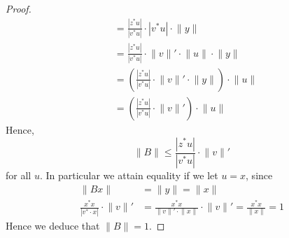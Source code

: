 \documentclass[12pt]{article}
\newenvironment{sol}[1][Solution]{\begin{trivlist}
		\item[\hskip \labelsep {\bfseries #1:}]}{\end{trivlist}}
\begin{document}
\begin{sol}
\begin{enumerate}[label=(\alph*)]
\begin{proof}
\begin{align*}
				&=\frac{|z^*u|}{|v^*u|}\cdot |v^*u| \cdot \lVert y\rVert\\
				&=\frac{|z^*u|}{|v^*u|}\cdot \lVert v\rVert'\cdot\lVert u\rVert\cdot  \lVert y\rVert\\
				&=\left(\frac{|z^*u|}{|v^*u|}\cdot \lVert v\rVert'\cdot  \lVert y\rVert\right)\cdot \lVert u\rVert\\
				&=\left(\frac{|z^*u|}{|v^*u|}\cdot \lVert v\rVert'\right)\cdot \lVert u\rVert
			\end{align*}
			Hence,
			\[
			\lVert B\rVert \leq \frac{|z^*u|}{|v^*u|}\cdot \lVert v\rVert'
			\]
			for all $u$. In particular we attain equality if we let $u=x$, since
			\begin{align*}
				\lVert Bx\rVert &= \lVert y\rVert = \lVert x\rVert\\
				\frac{x^*x}{|v^*\cdot x|}\cdot \lVert v\rVert' &= \frac{x^*x}{\lVert v\rVert'\cdot \lVert x\rVert}
				\cdot \lVert v\rVert'=\frac{x^*x}{\lVert x\rVert}=1
			\end{align*}
			Hence we deduce that $\lVert B\rVert=1$.
		\end{proof}
	\end{enumerate}
\end{sol}
\end{document}
